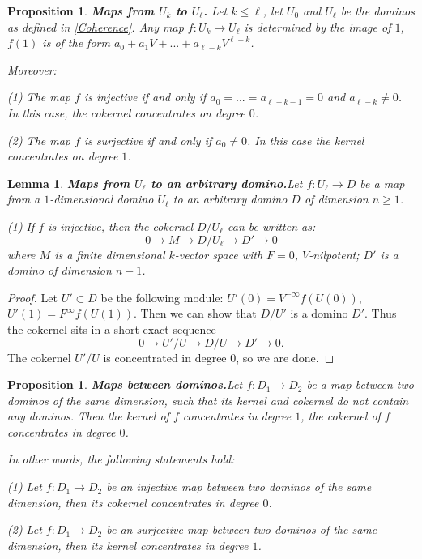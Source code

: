 \documentclass[a4paper,12pt,twoside]{report}
\newtheorem{proposition}[theorem]{Proposition}
\newtheorem{lemma}[theorem]{Lemma}
\begin{document}
\begin{proposition}{\bf Maps from $U_k$ to $U_{\ell}$.} \label{Injdim1}
    Let $k\leqslant \ell$, let $U_0$ and $U_{\ell}$ be the dominos as defined in \ref{Coherence}. 
    Any map $f:U_k\rightarrow U_{\ell}$ is determined by the image of $1$, $f(1)$ is of the form 
 $a_0+a_1V+...+a_{\ell-k}V^{\ell-k}$.

    Moreover: 
    
    {\rm (1)} The map $f$ is injective if and only if $a_0=...=a_{\ell-k-1}=0$ and $a_{\ell-k}\neq 0$. 
    In this case, the cokernel concentrates on degree $0$. 

    {\rm (2)} The map $f$ is surjective if and only if $a_0\neq 0$. 
    In this case the kernel concentrates on degree $1$. 
\end{proposition}

\begin{lemma}{\bf Maps from $U_{\ell}$ to an arbitrary domino.}\label{InjUD}
    Let $f:U_{\ell}\rightarrow D$ be a map from a $1$-dimensional domino $U_{\ell}$ to an arbitrary domino $D$ of dimension $n\geqslant 1$. 
    
    {\rm (1)} If $f$ is injective, then the cokernel $D/U_{\ell}$ can be written as: 
    \[0\rightarrow M\rightarrow D/U_{\ell}\rightarrow D'\rightarrow 0\]
    where $M$ is a finite dimensional $k$-vector space with $F=0$, $V$-nilpotent; $D'$ is a domino of dimension $n-1$.
\end{lemma}

\begin{proof}
     Let $U'\subset D$ be the following module: 
$U'(0) =V^{-\infty}f(U(0))$, $U'(1)=F^\infty f(U(1))$. 
Then we can show that $D/U'$ is a domino $D'$. 
Thus the cokernel sits in a short exact sequence \[0\rightarrow U'/U\rightarrow D/U\rightarrow D'\rightarrow 0.\]
The cokernel $U'/U$ is concentrated in degree $0$, so we are done.
\end{proof} 

\begin{proposition}{\bf Maps between dominos.}\label{MapsDD}
    Let $f: D_1\rightarrow D_2$ be a map between two dominos of the same dimension, such that its kernel and cokernel do not contain any dominos. 
    Then the kernel of $f$ concentrates in degree $1$, the cokernel of $f$ concentrates in degree $0$. 

    In other words, the following statements hold: 

    {\rm (1)} Let $f: D_1\rightarrow D_2$ be an injective map between two dominos of the same dimension, then its cokernel concentrates in degree $0$. 

    {\rm (2)} Let $f: D_1\rightarrow D_2$ be an surjective map between two dominos of the same dimension, then its kernel concentrates in degree $1$. 
\end{proposition}
\end{document}
